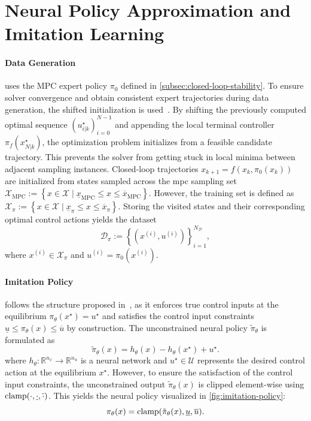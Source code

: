 \section{Neural Policy Approximation and Imitation Learning}
\label{sec:imitation-learning}


\paragraph{Data Generation} uses the MPC expert policy $\pi_0$ defined in \cref{subsec:closed-loop-stability}.
To ensure solver convergence and obtain consistent expert trajectories during data generation, 
the shifted initialization is used~. 
By shifting the previously computed optimal sequence $(u_{i|k}^\star)_{i=0}^{N-1}$ and appending the local terminal controller 
$\pi_f(x_{N|k}^\star)$, the optimization problem initializes from a feasible candidate trajectory. 
This prevents the solver from getting stuck in local minima between adjacent sampling instances.
Closed-loop trajectories $x_{k+1} = f(x_k, \pi_0(x_k))$ are initialized from states sampled across the mpc sampling
set $\mathcal{X}_{\mathrm{MPC}} := \left\{ x \in \mathcal{X} \mid \underline{x}_{\mathrm{MPC}} \leq x \leq \overline{x}_{\mathrm{MPC}} \right\}$.
However, the training set is defined as $\mathcal{X}_\pi := \left\{ x \in \mathcal{X} \mid \underline{x}_\pi \leq x \leq \overline{x}_\pi \right\}$. 
Storing the visited states and their corresponding optimal control actions yields the dataset
\begin{equation}
    \label{eq:dataset-definition}
    \mathcal{D}_\pi := \left\{ (x^{(i)}, u^{(i)}) \right\}_{i=1}^{N_{\mathcal{D}}},
\end{equation}
where $x^{(i)} \in \mathcal{X}_\pi$ and $u^{(i)} = \pi_0(x^{(i)})$.


\paragraph{Imitation Policy} follows the structure proposed in~\cite{yangLyapunovstableNeuralControl2024}, 
as it enforces true control inputs at the equilibrium $\pi_\theta(x^\star) = u^\star$ and 
satisfies the control input constraints $\underline{u} \leq \pi_\theta(x) \leq \overline{u}$ 
by construction. The unconstrained neural policy $\tilde{\pi}_\theta$ is formulated as 
\begin{equation}
    \label{eq:unc-policy-arch}
    \tilde{\pi}_\theta(x) = h_\theta(x) - h_\theta(x^\star) + u^\star.
\end{equation}
where $h_\theta : \mathbb{R}^{n_x} \to \mathbb{R}^{n_u}$ is a neural network and 
$u^\star \in \mathcal{U} $ represents the desired control action at the equilibrium $x^\star$.
However, to ensure the satisfaction of the control input constraints, the unconstrained output $\tilde{\pi}_\theta(x)$ 
is clipped element-wise using $\operatorname{clamp}(\cdot, \underline{\cdot}, \overline{\cdot})$. 
This yields the neural policy visualized in \cref{fig:imitation-policy}:
\begin{equation}
    \label{eq:policy-arch}
    \pi_\theta(x) = \operatorname{clamp}(\tilde{\pi}_\theta(x), \underline{u}, \overline{u}).
\end{equation}

